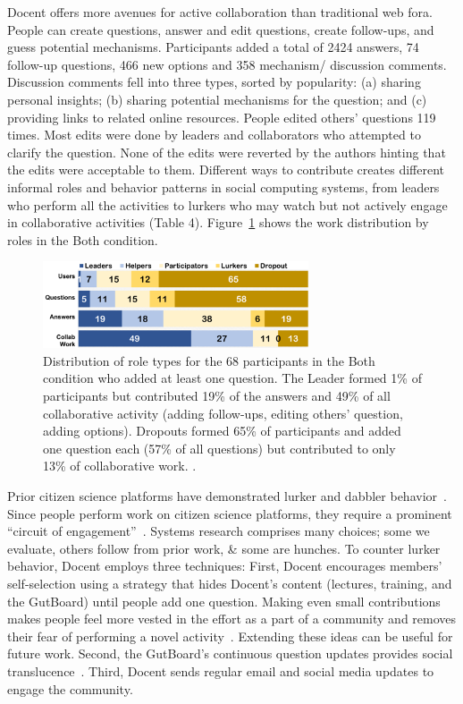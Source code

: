 Docent offers more avenues for active collaboration than traditional web fora. People can create questions, answer and edit questions, create follow-ups, and guess potential mechanisms. Participants added a total of 2424 answers, 74 follow-up questions, 466 new options and 358 mechanism/ discussion comments. Discussion comments fell into three types, sorted by popularity: (a) sharing personal insights; (b) sharing potential mechanisms for the question; and (c) providing links to related online resources. People edited others’ questions 119 times. Most edits were done by leaders and collaborators who attempted to clarify the question. None of the edits were reverted by the authors hinting that the edits were acceptable to them. Different ways to contribute creates different informal roles and behavior patterns in social computing systems, from leaders who perform all the activities to lurkers who may watch but not actively engage in collaborative activities (Table 4). Figure~\ref{fig:docent-6} shows the work distribution by roles in the Both condition.

\begin{figure}[h] 
  \centering
  \includegraphics[width=0.7\textwidth]{figures/docent/fig-6.png}
  \caption[Distribution of role types]
{Distribution of role types for the 68 participants in the Both condition who added at least one question. The Leader formed 1\% of participants but contributed 19\% of the answers and 49\% of all collaborative activity (adding follow-ups, editing others’ question, adding options). Dropouts formed 65\% of participants and added one question each (57\% of all questions) but contributed to only 13\% of collaborative work. .}
  \label{fig:docent-6}
\end{figure}

Prior citizen science platforms have demonstrated lurker and dabbler behavior~\cite{Eveleigh2014}. Since people perform work on citizen science platforms, they require a prominent “circuit of engagement”~\cite{Rotman2012}. Systems research comprises many choices; some we evaluate, others follow from prior work, \& some are hunches. To counter lurker behavior, Docent employs three techniques: First, Docent encourages members’ self-selection using a strategy that hides Docent’s content (lectures, training, and the GutBoard) until people add one question. Making even small contributions makes people feel more vested in the effort as a part of a community and removes their fear of performing a novel activity~\cite{Resnick2011}. Extending these ideas can be useful for future work. Second, the GutBoard’s continuous question updates provides social translucence~\cite{Resnick2011}. Third, Docent sends regular email and social media updates to engage the community.

